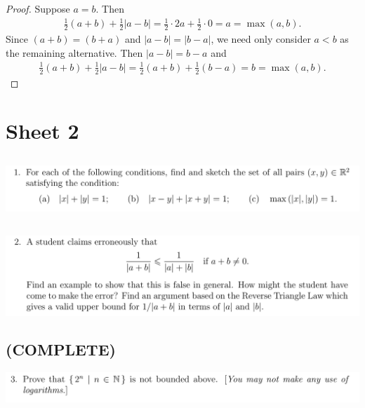 \documentclass[12pt]{article}
\begin{document}
\begin{proof}
  Suppose $a = b$. Then
  \begin{align*}
    \frac{1}{2}(a + b) + \frac{1}{2}|a - b|
    = \frac{1}{2}\cdot 2a + \frac{1}{2}\cdot 0
    = a
    = \max(a, b).
  \end{align*}
  Since $(a + b) = (b + a)$ and $|a - b| = |b - a|$, we need only consider $a < b$ as the remaining
  alternative. Then $|a - b| = b - a$ and
  \begin{align*}
    \frac{1}{2}(a + b) + \frac{1}{2}|a - b|
    = \frac{1}{2}(a + b) + \frac{1}{2}(b - a)
    = b
    = \max(a, b).
  \end{align*}
\end{proof}

\newpage
\section{Sheet 2}

\newpage
\subsection{}
\begin{mdframed}
  \includegraphics[width=400pt]{img/oxford-M2-analysis-I-2-1.png}
\end{mdframed}

\newpage
\subsection{}
\begin{mdframed}
  \includegraphics[width=400pt]{img/oxford-M2-analysis-I-2-2.png}
\end{mdframed}

\newpage
\subsection{(COMPLETE)}
\begin{mdframed}
  \includegraphics[width=400pt]{img/oxford-M2-analysis-I-2-3.png}
\end{mdframed}
\end{document}
